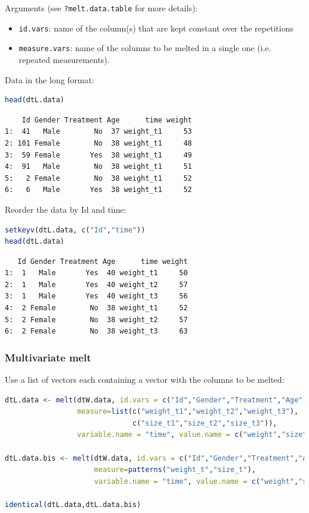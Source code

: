 \documentclass{article}
\begin{document}
Arguments (see \texttt{?melt.data.table} for more details):
\begin{itemize}
\item \texttt{id.vars}: name of the column(s) that are kept constant over the repetitions
\item \texttt{measure.vars}: name of the columns to be melted in a single one
(i.e. repeated measurements).
\end{itemize}

\bigskip

Data in the long format:
\begin{lstlisting}[language=r,numbers=none]
head(dtL.data)
\end{lstlisting}

\label{}
\begin{verbatim}
    Id Gender Treatment Age      time weight
1:  41   Male        No  37 weight_t1     53
2: 101 Female        No  38 weight_t1     48
3:  59 Female       Yes  38 weight_t1     49
4:  91   Male        No  38 weight_t1     51
5:   2 Female        No  38 weight_t1     52
6:   6   Male       Yes  38 weight_t1     52
\end{verbatim}


Reorder the data by Id and time:
\begin{lstlisting}[language=r,numbers=none]
setkeyv(dtL.data, c("Id","time"))
head(dtL.data)
\end{lstlisting}

\label{}
\begin{verbatim}
   Id Gender Treatment Age      time weight
1:  1   Male       Yes  40 weight_t1     50
2:  1   Male       Yes  40 weight_t2     57
3:  1   Male       Yes  40 weight_t3     56
4:  2 Female        No  38 weight_t1     52
5:  2 Female        No  38 weight_t2     57
6:  2 Female        No  38 weight_t3     63
\end{verbatim}


\clearpage
\subsubsection{Multivariate melt}
\label{sec:orgfbf9fa4}

Use a list of vectors each containing a vector with the columns to be
melted:
\begin{lstlisting}[language=r,numbers=none]
dtL.data <- melt(dtW.data, id.vars = c("Id","Gender","Treatment","Age"), 
                 measure=list(c("weight_t1","weight_t2","weight_t3"), 
                              c("size_t1","size_t2","size_t3")),
                 variable.name = "time", value.name = c("weight","size"))

dtL.data.bis <- melt(dtW.data, id.vars = c("Id","Gender","Treatment","Age"), 
                     measure=patterns("weight_t","size_t"),
                     variable.name = "time", value.name = c("weight","size"))

identical(dtL.data,dtL.data.bis)
\end{lstlisting}
\end{document}

